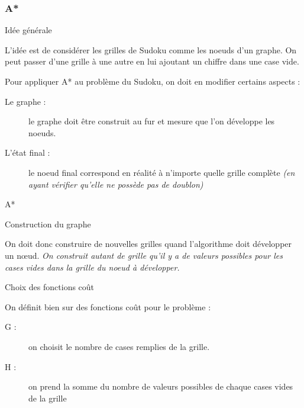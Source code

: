 
\begin{frame}
    \frametitle{A*}

\begin{block}{Idée générale}

L'idée est de considérer les grilles de Sudoku comme les noeuds d'un graphe. On peut passer d'une grille à une autre en lui ajoutant un chiffre dans une case vide.

\bigskip

Pour appliquer A* au problème du Sudoku, on doit en modifier certains aspects :

\begin{description}
\item[Le graphe :]  le graphe doit être construit au fur et mesure que l'on développe les noeuds.

\item[L'état final :] le noeud final correspond en réalité à n'importe quelle grille complète \textit{(en ayant vérifier qu'elle ne possède pas de doublon)}

\end{description}

\end{block}
\end{frame}

\begin{frame}{A*}
\begin{block}{Construction du graphe}

On doit donc construire de nouvelles grilles quand l'algorithme doit développer un nœud. \textit{On construit autant de grille qu'il y a de valeurs possibles pour les cases vides dans la grille du noeud à développer.}

\end{block}

\begin{alertblock}{Choix des fonctions coût}

On définit bien sur des fonctions coût pour le problème :

\begin{description}
\item[G : ] on choisit le nombre de cases remplies de la grille.

\item[H : ] on prend la somme du nombre de valeurs possibles de chaque cases vides de la grille

\end{description}


\end{alertblock}
\end{frame}

